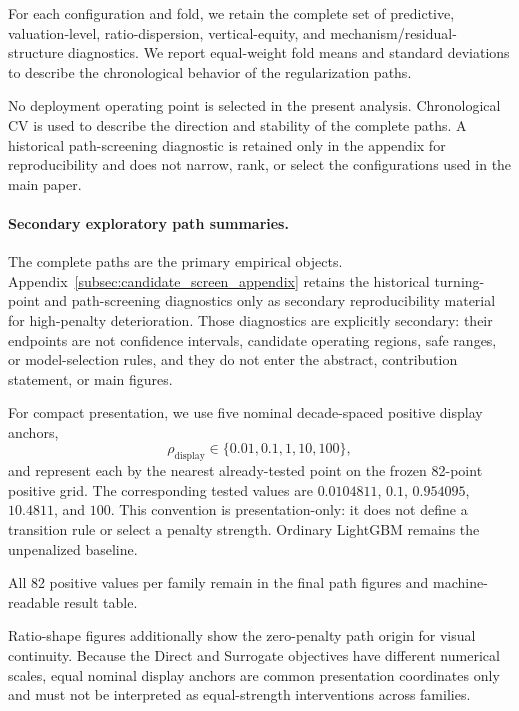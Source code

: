 \documentclass[10pt]{article}
\theoremstyle{definition}
\newcommand{\1}{\mathbf{1}}
\begin{document}

For each configuration and fold, we retain the complete set of predictive,
valuation-level, ratio-dispersion, vertical-equity, and mechanism/residual-structure diagnostics.
We report equal-weight fold means and standard deviations to describe the
chronological behavior of the regularization paths.

No deployment operating point is selected in the present analysis. Chronological CV is used to describe the direction and stability of the complete paths. A historical path-screening diagnostic is retained only in the appendix for reproducibility and does not narrow, rank, or select the configurations used in the main paper.

\paragraph{Secondary exploratory path summaries.}
The complete paths are the primary empirical objects. Appendix~\ref{subsec:candidate_screen_appendix} retains the historical turning-point and path-screening diagnostics only as secondary reproducibility material for high-penalty deterioration. Those diagnostics are explicitly secondary: their endpoints are not confidence intervals, candidate operating regions, safe ranges, or model-selection rules, and they do not enter the abstract, contribution statement, or main figures.

For compact presentation, we use five nominal decade-spaced positive display anchors,
\[
\rho_{\mathrm{display}}\in\{0.01,0.1,1,10,100\},
\]
and represent each by the nearest already-tested point on the frozen 82-point positive grid. The corresponding tested values are $0.0104811$, $0.1$, $0.954095$, $10.4811$, and $100$. This convention is presentation-only: it does not define a transition rule or select a penalty strength. Ordinary LightGBM remains the unpenalized baseline.

All 82 positive values per family remain in the final path figures and machine-readable result table.

Ratio-shape figures additionally show the zero-penalty path origin for visual continuity. Because the Direct and Surrogate objectives have different numerical scales, equal nominal display anchors are common presentation coordinates only and must not be interpreted as equal-strength interventions across families.
\end{document}
